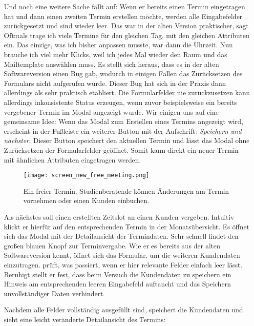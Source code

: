Und noch eine weitere Sache fällt \ipName auf: Wenn er bereits einen Termin
eingetragen hat und dann einen zweiten Termin erstellen möchte, werden alle
Eingabefelder zurückgesetzt und sind wieder leer. \glqq{}Das war in der alten
Version praktischer\grqq{}, sagt \ipName \glqq{}Oftmals trage ich viele Termine
für den gleichen Tag, mit den gleichen Attributen ein. Das einzige, was ich
bisher anpassen musste, war dann die Uhrzeit. Nun brauche ich viel mehr Klicks,
weil ich jedes Mal wieder den Raum und das Mailtemplate auswählen
muss.\grqq{} \cite{clavesUsertest} Es stellt sich heraus, dass es in der alten
Softwareversion einen Bug gab, wodurch in einigen Fällen das Zurücksetzen des
Formulars nicht aufgerufen wurde. Dieser Bug hat sich in der Praxis dann
allerdings als sehr praktisch etabliert. Die Formularfelder nie zurückzusetzen
kann allerdings inkonsistente Status erzeugen, wenn zuvor beispielsweise ein
bereits vergebener Termin im Modal angezeigt wurde. Wir einigen uns auf eine
gemeinsame Idee: Wenn das Modal zum Erstellen eines Termins angezeigt wird,
erscheint in der Fußleiste ein weiterer Button mit der Aufschrift:
\textit{Speichern und nächster}. Dieser Button speichert den aktuellen Termin
und lässt das Modal ohne Zurücksetzen der Formularfelder geöffnet. Somit kann
direkt ein neuer Termin mit ähnlichen Attributen eingetragen werden.

\begin{figure}[H]
    \caption{Ein freier Termin. Studienberatende können Änderungen am Termin vornehmen oder einen Kunden einbuchen.}
    \centering
    \texttt{[image: screen\_new\_free\_meeting.png]}
\end{figure}

Als nächstes soll \ipName einen erstellten Zeitslot an einen Kunden vergeben.
Intuitiv klickt er hierfür auf den entsprechenden Termin in der
Monatsübersicht. Es öffnet sich das Modal mit der Detailansicht der
Termindaten. Sehr schnell findet \ipName den großen blauen Knopf zur
Terminvergabe. Wie er es bereits aus der alten Softwareversion kennt, öffnet
sich das Formular, um die weiteren Kundendaten einzutragen. \ipName prüft, was
passiert, wenn er hier relevante Felder einfach leer lässt. Beruhigt stellt er
fest, dass beim Versuch die Kundendaten zu speichern ein Hinweis am
entsprechenden leeren Eingabefeld auftaucht und das Speichern unvollständiger
Daten verhindert.

Nachdem alle Felder vollständig ausgefüllt sind, speichert \ipName die
Kundendaten und sieht eine leicht veränderte Detailansicht des Termins:

